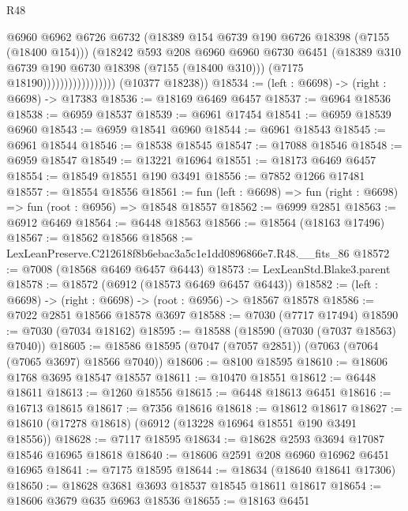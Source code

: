 \begin{lexlean}{R48}
\begin{coremodule}
                                    @6960
                                    @6962
                                    @6726
                                    @6732
                                    (@18389 @154 @6739 @190 @6726 @18398 (@7155 (@18400 @154)))
                                    (@18242
                                      @593
                                      @208
                                      @6960
                                      @6960
                                      @6730
                                      @6451
                                      (@18389 @310 @6739 @190 @6730 @18398 (@7155 (@18400 @310)))
                                      (@7175 @18190)))))))))))))))))
      (@10377 @18238))
@18534 := (left : @6698) -> (right : @6698) -> @17383
@18536 := @18169 @6469 @6457
@18537 := @6964 @18536
@18538 := @6959 @18537
@18539 := @6961 @17454
@18541 := @6959 @18539 @6960
@18543 := @6959 @18541 @6960
@18544 := @6961 @18543
@18545 := @6961 @18544
@18546 := @18538 @18545
@18547 := @17088 @18546
@18548 := @6959 @18547
@18549 := @13221 @16964
@18551 := @18173 @6469 @6457
@18554 := @18549 @18551 @190 @3491
@18556 := @7852 @1266 @17481
@18557 := @18554 @18556
@18561 := fun (left : @6698) => fun (right : @6698) => fun (root : @6956) => @18548 @18557
@18562 := @6999 @2851
@18563 := @6912 @6469
@18564 := @6448 @18563
@18566 := @18564 (@18163 @17496)
@18567 := @18562 @18566
@18568 := LexLeanPreserve.C212618f8b6ebac3a5c1e1dd0896866e7.R48.__fits_86
@18572 := @7008 (@18568 @6469 @6457 @6443)
@18573 := LexLeanStd.Blake3.parent
@18578 := @18572 (@6912 (@18573 @6469 @6457 @6443))
@18582 := (left : @6698) -> (right : @6698) -> (root : @6956) -> @18567 @18578
@18586 := @7022 @2851 @18566 @18578 @3697
@18588 := @7030 (@7717 @17494)
@18590 := @7030 (@7034 @18162)
@18595 := @18588 (@18590 (@7030 (@7037 @18563) @7040))
@18605 := @18586 @18595 (@7047 (@7057 @2851)) (@7063 (@7064 (@7065 @3697) @18566 @7040))
@18606 := @8100 @18595
@18610 := @18606 @1768 @3695 @18547 @18557
@18611 := @10470 @18551
@18612 := @6448 @18611
@18613 := @1260 @18556
@18615 := @6448 @18613 @6451
@18616 := @16713 @18615
@18617 := @7356 @18616
@18618 := @18612 @18617
@18627 := @18610 (@17278 @18618) (@6912 (@13228 @16964 @18551 @190 @3491 @18556))
@18628 := @7117 @18595
@18634 := @18628 @2593 @3694 @17087 @18546 @16965 @18618
@18640 := @18606 @2591 @208 @6960 @16962 @6451 @16965
@18641 := @7175 @18595
@18644 := @18634 (@18640 @18641 @17306)
@18650 := @18628 @3681 @3693 @18537 @18545 @18611 @18617
@18654 := @18606 @3679 @635 @6963 @18536
@18655 := @18163 @6451

\end{coremodule}
\end{lexlean}
